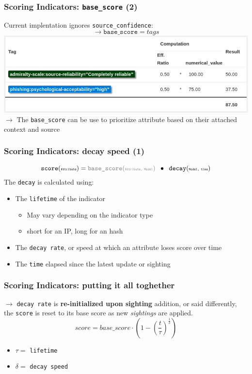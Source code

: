 \begin{frame}
    \frametitle{Scoring Indicators: \texttt{base\_score} (2)}
    Current implentation ignores \texttt{source\_confidence}:
    $$\rightarrow \texttt{base\_score} = tags$$
    \includegraphics[width=1.0\linewidth]{pics/bs-computation-steps.png}
    $\rightarrow$ The \texttt{base\_score} can be use to prioritize attribute based on their attached context and source
\end{frame}

\begin{frame}
    \frametitle{Scoring Indicators: decay speed (1)}
    $$ \texttt{score}(\texttt{\tiny Attribute}) = {\color{gray}\texttt{base\_score}(\texttt{\tiny Attribute, Model})} \;\;\bullet\;\; \texttt{decay}(\texttt{\tiny Model, time}) $$
    The \texttt{decay} is calculated using:
   \begin{itemize}
       \item The \texttt{lifetime} of the indicator
       \begin{itemize}
           \item May vary depending on the indicator type
           \item short for an IP, long for an hash
       \end{itemize}
       \item The \texttt{decay rate}, or speed at which an attribute loses score over time
       \item The \texttt{time} elapsed since the latest update or sighting
   \end{itemize}
\end{frame}

\begin{frame}
    \frametitle{Scoring Indicators: putting it all toghether}
    $\rightarrow$ \texttt{decay rate} is \textbf{re-initialized upon sighting} addition, or said differently, the \texttt{score} is reset to its base score as new \textit{sightings} are applied.
    $$score = base\_score \cdot \left( 1 - \left( \frac{t}{\tau} \right)^{\frac{1}{\delta}} \right) $$
    \begin{itemize}
        \item $\tau = $ \texttt{lifetime}
        \item $\delta = $ \texttt{decay speed}
    \end{itemize}
\end{frame}

